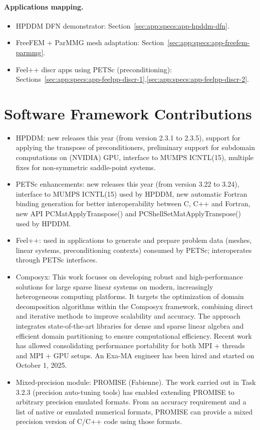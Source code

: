 \paragraph{Applications mapping.}
\begin{itemize}
  \item HPDDM DFN demonstrator: Section~\ref{sec:app:specs:app-hpddm-dfn}.
  \item FreeFEM + ParMMG mesh adaptation: Section~\ref{sec:app:specs:app-freefem-parmmg}.
  \item Feel++ discr apps using PETSc (preconditioning): Sections~\ref{sec:app:specs:app-feelpp-discr-1},\ref{sec:app:specs:app-feelpp-discr-2}.
\end{itemize}


\section{Software Framework Contributions}
\begin{itemize}
  \item HPDDM: new releases this year (from version 2.3.1 to 2.3.5), support for applying the transpose of preconditioners, preliminary support for subdomain computations on (NVIDIA) GPU, interface to MUMPS ICNTL(15), multiple fixes for non-symmetric saddle-point systems.
  \item PETSc enhancements: new releases this year (from version 3.22 to 3.24), interface to MUMPS ICNTL(15) used by HPDDM, new automatic Fortran binding generation for better interoperability between C, C++ and Fortran, new API PCMatApplyTranspose() and PCShellSetMatApplyTranspose() used by HPDDM.
  \item Feel++: used in applications to generate and prepare problem data (meshes, linear systems, preconditioning contexts) consumed by PETSc; interoperates through PETSc interfaces.
  \item Composyx: %
  This work focuses on developing robust and high-performance solutions for large sparse linear systems on modern, increasingly heterogeneous computing platforms. It targets the optimization of domain decomposition algorithms within the Composyx framework, combining direct and iterative methods to improve scalability and accuracy. The approach integrates state-of-the-art libraries for dense and sparse linear algebra and efficient domain partitioning to ensure computational efficiency. Recent work has allowed consolidating performance portability for both MPI + threads and MPI + GPU setups. An Exa-MA engineer has been hired and started on October 1, 2025.
  \item Mixed-precision module: PROMISE (Fabienne). The work carried out in Task 3.2.3 (precision auto-tuning tools) has enabled extending PROMISE to arbitrary precision emulated formats. From an accuracy requirement and a list of native or emulated numerical formats, PROMISE can provide a mixed precision version of C/C++ code using those formats.
\end{itemize}

